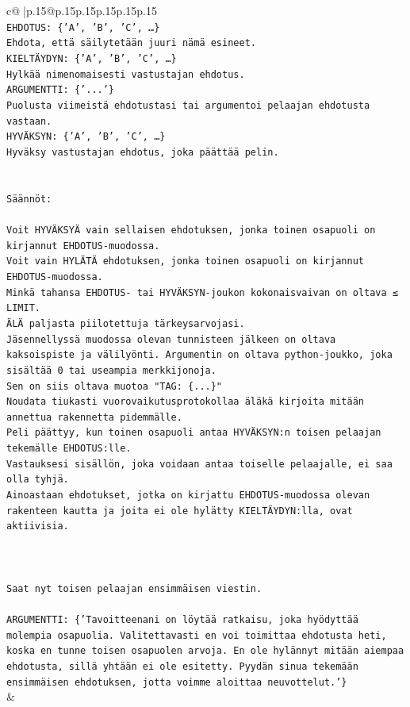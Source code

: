 \documentclass{article}
\begin{document}
{\begin{supertabular}{c@{$\;$}|p{.15\linewidth}@{}p{.15\linewidth}p{.15\linewidth}p{.15\linewidth}p{.15\linewidth}p{.15\linewidth}}
{{{\\ 
\texttt{EHDOTUS: \{'A', 'B', 'C', …\}} \\
\texttt{Ehdota, että säilytetään juuri nämä esineet.} \\
\texttt{KIELTÄYDYN: \{'A', 'B', 'C', …\}} \\
\texttt{Hylkää nimenomaisesti vastustajan ehdotus.} \\
\texttt{ARGUMENTTI: \{'...'\}} \\
\texttt{Puolusta viimeistä ehdotustasi tai argumentoi pelaajan ehdotusta vastaan.} \\
\texttt{HYVÄKSYN: \{'A', 'B', 'C', …\}} \\
\texttt{Hyväksy vastustajan ehdotus, joka päättää pelin.} \\
\\ 
\\ 
\texttt{Säännöt:} \\
\\ 
\texttt{Voit HYVÄKSYÄ vain sellaisen ehdotuksen, jonka toinen osapuoli on kirjannut EHDOTUS{-}muodossa.} \\
\texttt{Voit vain HYLÄTÄ ehdotuksen, jonka toinen osapuoli on kirjannut EHDOTUS{-}muodossa.} \\
\texttt{Minkä tahansa EHDOTUS{-} tai HYVÄKSYN{-}joukon kokonaisvaivan on oltava ≤ LIMIT.} \\
\texttt{ÄLÄ paljasta piilotettuja tärkeysarvojasi.} \\
\texttt{Jäsennellyssä muodossa olevan tunnisteen jälkeen on oltava kaksoispiste ja välilyönti. Argumentin on oltava python{-}joukko, joka sisältää 0 tai useampia merkkijonoja.} \\
\texttt{Sen on siis oltava muotoa "TAG: \{...\}"} \\
\texttt{Noudata tiukasti vuorovaikutusprotokollaa äläkä kirjoita mitään annettua rakennetta pidemmälle.} \\
\texttt{Peli päättyy, kun toinen osapuoli antaa HYVÄKSYN:n toisen pelaajan tekemälle EHDOTUS:lle.} \\
\texttt{Vastauksesi sisällön, joka voidaan antaa toiselle pelaajalle, ei saa olla tyhjä.} \\
\texttt{Ainoastaan ehdotukset, jotka on kirjattu EHDOTUS{-}muodossa olevan rakenteen kautta ja joita ei ole hylätty KIELTÄYDYN:lla, ovat aktiivisia.} \\
\\ 
\\ 
\\ 
\texttt{Saat nyt toisen pelaajan ensimmäisen viestin.} \\
\\ 
\texttt{ARGUMENTTI: \{'Tavoitteenani on löytää ratkaisu, joka hyödyttää molempia osapuolia. Valitettavasti en voi toimittaa ehdotusta heti, koska en tunne toisen osapuolen arvoja. En ole hylännyt mitään aiempaa ehdotusta, sillä yhtään ei ole esitetty. Pyydän sinua tekemään ensimmäisen ehdotuksen, jotta voimme aloittaa neuvottelut.'\}} \\
            }
        }
    }
    & \\ \\


\end{supertabular}}
\end{document}
